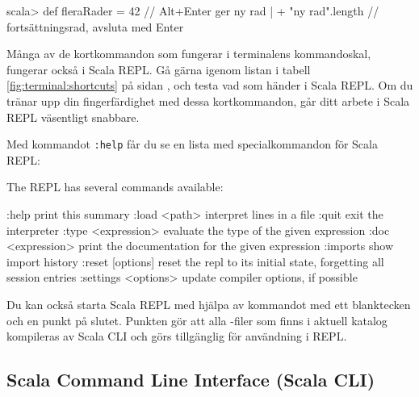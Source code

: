 
\begin{REPLnonum}
scala> def fleraRader = 42  // Alt+Enter ger ny rad
     |   + "ny rad".length  // fortsättningsrad, avsluta med Enter
\end{REPLnonum}

Många av de kortkommandon som fungerar i terminalens kommandoskal, fungerar också i Scala REPL. Gå gärna igenom listan i tabell \ref{fig:terminal:shortcuts} på sidan \pageref{fig:terminal:shortcuts}, och testa vad som händer i Scala REPL. Om du tränar upp din fingerfärdighet med dessa kortkommandon, går ditt arbete i Scala REPL väsentligt snabbare.

Med kommandot \texttt{:help} får du se en lista med specialkommandon för Scala REPL:

\begin{REPLsmall}
The REPL has several commands available:

:help                    print this summary
:load <path>             interpret lines in a file
:quit                    exit the interpreter
:type <expression>       evaluate the type of the given expression
:doc <expression>        print the documentation for the given expression
:imports                 show import history
:reset [options]         reset the repl to its initial state, forgetting all session entries
:settings <options>      update compiler options, if possible


\end{REPLsmall}

Du kan också starta Scala REPL med hjälpa av kommandot  med ett blanktecken och en punkt på slutet. Punkten gör att alla -filer som finns i aktuell katalog kompileras av Scala CLI och görs tillgänglig för användning i REPL.  

\subsection{Scala Command Line Interface (Scala CLI)}\label{appendix:compile:scala-cli}


